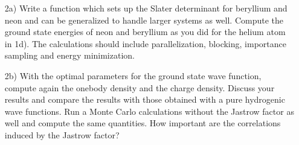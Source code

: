 \begin{enumerate}
\item[2a)]   Write a function which sets up the Slater determinant for beryllium and neon and can be generalized to
handle larger systems as well. 
Compute the ground state energies of neon and beryllium as you did for the helium atom
in 1d). 
The calculations should include  parallelization, blocking, importance sampling and energy minimization.  


\item[2b)]  With the optimal parameters for the ground state wave function, compute again the onebody density and 
the charge density. Discuss your results and compare the results with those obtained with a pure hydrogenic wave functions. Run a Monte Carlo calculations without the Jastrow factor as well
and compute the same quantities. How important are the correlations induced by the Jastrow factor?


\end{enumerate}